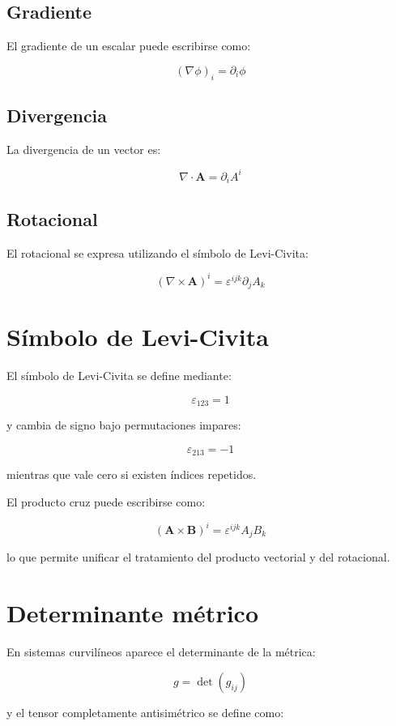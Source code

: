 \documentclass[12pt]{article}
\begin{document}
\subsection{Gradiente}

El gradiente de un escalar puede escribirse como:

\[
(\nabla \phi)_i=
\partial_i\phi
\]

\subsection{Divergencia}

La divergencia de un vector es:

\[
\nabla\cdot\mathbf{A}
=
\partial_iA^i
\]

\subsection{Rotacional}

El rotacional se expresa utilizando el símbolo de Levi-Civita:

\[
(\nabla\times\mathbf{A})^i
=
\varepsilon^{ijk}
\partial_jA_k
\]

\section{Símbolo de Levi-Civita}

El símbolo de Levi-Civita se define mediante:

\[
\varepsilon_{123}=1
\]

y cambia de signo bajo permutaciones impares:

\[
\varepsilon_{213}=-1
\]

mientras que vale cero si existen índices repetidos.

El producto cruz puede escribirse como:

\[
(\mathbf{A}\times\mathbf{B})^i
=
\varepsilon^{ijk}
A_jB_k
\]

lo que permite unificar el tratamiento del producto vectorial y del rotacional.

\section{Determinante métrico}

En sistemas curvilíneos aparece el determinante de la métrica:

\[
g=\det(g_{ij})
\]

y el tensor completamente antisimétrico se define como:
\end{document}
